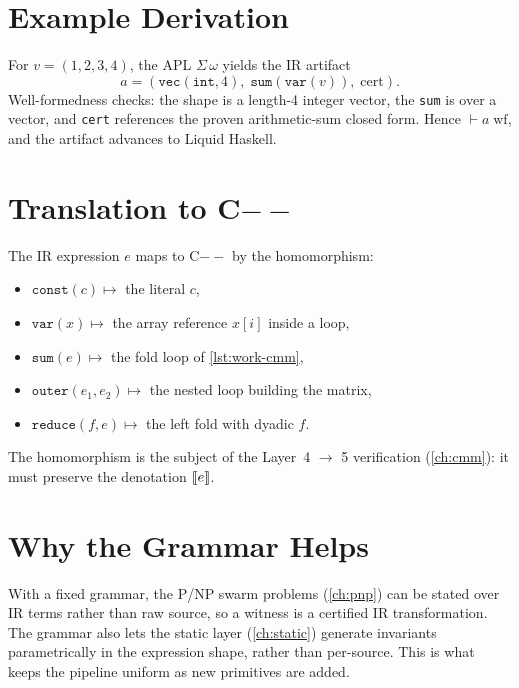 \section{Example Derivation}
\label{sec:irg-ex}

For $v=(1,2,3,4)$, the APL $\Sigma\,\omega$ yields the IR artifact
\[
a = (\texttt{vec}(\texttt{int},4),\; \texttt{sum}(\texttt{var}(v)),\;
      \text{cert}).
\]
Well-formedness checks: the shape is a length-4 integer vector, the
\texttt{sum} is over a vector, and \texttt{cert} references the proven
arithmetic-sum closed form. Hence $\vdash a\;\text{wf}$, and the artifact
advances to Liquid Haskell.

\section{Translation to C$--$}
\label{sec:irg-cmm}

The IR expression $e$ maps to C$--$ by the homomorphism:
\begin{itemize}
  \item $\texttt{const}(c) \mapsto$ the literal $c$,
  \item $\texttt{var}(x) \mapsto$ the array reference $x[i]$ inside a loop,
  \item $\texttt{sum}(e) \mapsto$ the fold loop of \cref{lst:work-cmm},
  \item $\texttt{outer}(e_1,e_2) \mapsto$ the nested loop building the
        matrix,
  \item $\texttt{reduce}(f,e) \mapsto$ the left fold with dyadic $f$.
\end{itemize}
The homomorphism is the subject of the Layer~4 $\to$ 5 verification
(\cref{ch:cmm}): it must preserve the denotation $\left\llbracket e \right\rrbracket$.

\section{Why the Grammar Helps}
\label{sec:irg-why2}

With a fixed grammar, the P/NP swarm problems (\cref{ch:pnp}) can be stated
over IR terms rather than raw source, so a witness is a certified IR
transformation. The grammar also lets the static layer (\cref{ch:static})
generate invariants parametrically in the expression shape, rather than
per-source. This is what keeps the pipeline uniform as new primitives are
added.
